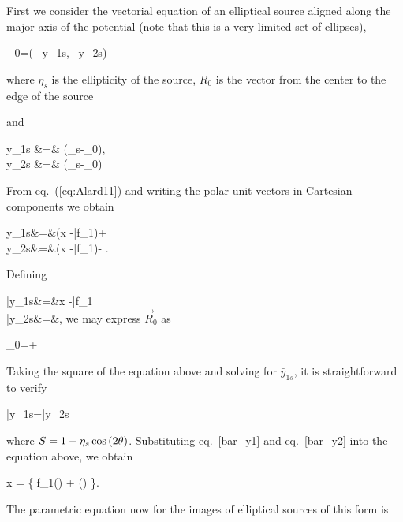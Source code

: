 First we consider the vectorial equation of an elliptical source
aligned along the major axis of the potential (note that this is a
very limited set of ellipses),

\beq
\label{eq:ellipse}
_0=\left( \, y_{1s}, \, y_{2s}\right)
\eeq

where $\eta_s$ is the ellipticity of the source, $R_0$ is the vector from the
center to the edge of the source

and
 
\bea
y_{1s} &=& (_s-_0)\cdot{}, \\
y_{2s} &=& (_s-_0)\cdot{}
\eea

From eq.~(\ref{eq:Alard11}) and writing the polar unit vectors in Cartesian
components we obtain

\bea
y_{1s}&=&(\kt x -\bar{f}_1)\cos{\te}+\sin{\te} \label{y_1s}\\
y_{2s}&=&(\kt x -\bar{f}_1)\sin{\te}-\cos{\te} \label{y_2s}.
\eea

Defining

\bea
\bar{y}_{1s}&=&\kt x -\bar{f}_1\label{bar_y1}\\
\bar{y}_{2s}&=&,\label{bar_y2}
\eea
we may express $\vec{R}_0$ as

\beq
{}_0=\hat{\imath}+\hat{\jmath}
\eeq

Taking the square of the equation above and solving for $\bar{y}_{1s}$, it is
straightforward to verify

\beq
\bar{y}_{1s}=\bar{y}_{2s}\pm {}
\eeq

where $S=1-\eta_s\cos{(2\theta)}$. Substituting eq.~\eqref{bar_y1} and
eq.~\eqref{bar_y2} into the equation above, we obtain

\beq
x =  \left\{\bar{f}_{1}(\theta) +
\left(\right) \pm {}  \right\}.
\label{elliptical_contour}
\eeq

The parametric equation now for the images of elliptical sources of this form is

